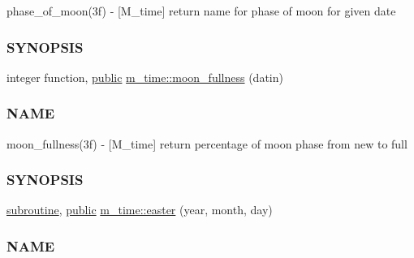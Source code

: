 \begin{DoxyCompactItemize}
\begin{DoxyCompactList}
phase\+\_\+of\+\_\+moon(3f) -\/ \mbox{[}M\+\_\+time\mbox{]} return name for phase of moon for given date \subsubsection*{S\+Y\+N\+O\+P\+S\+IS}\end{DoxyCompactList}\item 
integer function, \hyperlink{M__stopwatch_83_8txt_a2f74811300c361e53b430611a7d1769f}{public} \hyperlink{namespacem__time_a702b39998a769b8f60070c0bec975ee2}{m\+\_\+time\+::moon\+\_\+fullness} (datin)
\begin{DoxyCompactList}\small\item\em \subsubsection*{N\+A\+ME}

moon\+\_\+fullness(3f) -\/ \mbox{[}M\+\_\+time\mbox{]} return percentage of moon phase from new to full \subsubsection*{S\+Y\+N\+O\+P\+S\+IS}\end{DoxyCompactList}\item 
\hyperlink{M__stopwatch_83_8txt_acfbcff50169d691ff02d4a123ed70482}{subroutine}, \hyperlink{M__stopwatch_83_8txt_a2f74811300c361e53b430611a7d1769f}{public} \hyperlink{namespacem__time_af3c98ac7124f9fe2584cc76688b00094}{m\+\_\+time\+::easter} (year, month, day)
\begin{DoxyCompactList}\small\item\em \subsubsection*{N\+A\+ME}


\end{DoxyCompactList}
\end{DoxyCompactItemize}
